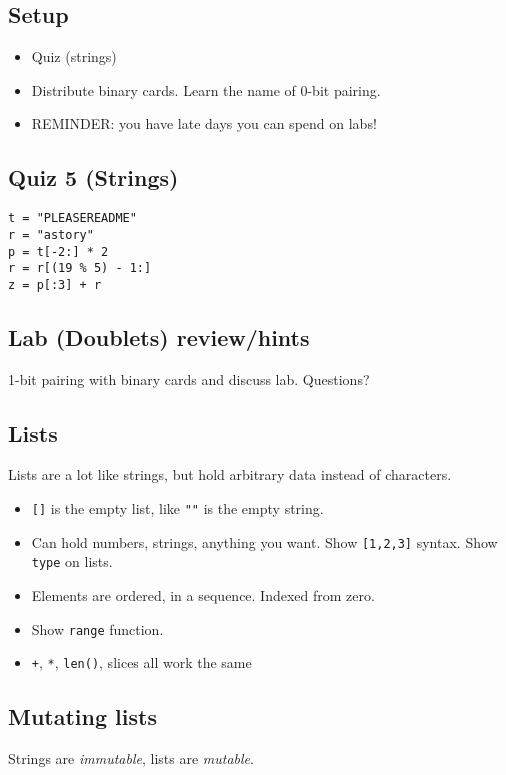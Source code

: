 \documentclass{article}
\begin{document}
\subsection*{Setup}
\begin{itemize}
\item Quiz (strings)
\item Distribute binary cards.  Learn the name of 0-bit pairing.
\item REMINDER: you have late days you can spend on labs!
\end{itemize}

\subsection*{Quiz 5 (Strings)}
\begin{verbatim}
t = "PLEASEREADME"
r = "astory"
p = t[-2:] * 2
r = r[(19 % 5) - 1:]
z = p[:3] + r
\end{verbatim}

\subsection*{Lab (Doublets) review/hints}

1-bit pairing with binary cards and discuss lab.  Questions?

\subsection*{Lists}

Lists are a lot like strings, but hold arbitrary data instead of
characters.
\begin{itemize}
\item \verb|[]| is the empty list, like \verb|""| is the empty string.
\item Can hold numbers, strings, anything you want.  Show
  \verb|[1,2,3]| syntax.  Show \verb|type| on lists.
\item Elements are ordered, in a sequence.  Indexed from zero.
\item Show \verb|range| function.
\item \verb|+|, \verb|*|, \verb|len()|, slices all work the same
\end{itemize}

\subsection*{Mutating lists}

Strings are \emph{immutable}, lists are \emph{mutable}.
\end{document}
